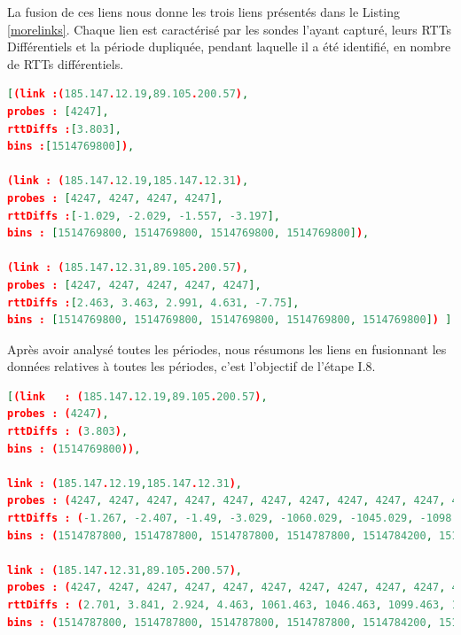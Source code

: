 La fusion de ces liens nous donne les trois liens présentés dans le Listing \ref{morelinks}. Chaque lien est caractérisé par les sondes l'ayant capturé, leurs  RTTs Différentiels et la période dupliquée, pendant laquelle il a été identifié, en nombre de RTTs différentiels. 

\begin{lstlisting}[language=json,firstnumber=1, caption={Caractérisation des liens identifiés lors  de la période 1514769800 avec les traceroutes T1, T2, T3, T4 et T5}, basicstyle = \footnotesize, label =morelinks]
[(link :(185.147.12.19,89.105.200.57),
probes : [4247],
rttDiffs :[3.803],
bins :[1514769800]),

(link : (185.147.12.19,185.147.12.31),
probes : [4247, 4247, 4247, 4247],
rttDiffs :[-1.029, -2.029, -1.557, -3.197],
bins : [1514769800, 1514769800, 1514769800, 1514769800]),

(link : (185.147.12.31,89.105.200.57),
probes : [4247, 4247, 4247, 4247, 4247],
rttDiffs :[2.463, 3.463, 2.991, 4.631, -7.75],
bins : [1514769800, 1514769800, 1514769800, 1514769800, 1514769800]) ]
\end{lstlisting}

Après avoir analysé  toutes les périodes, nous résumons les liens en fusionnant les données relatives à toutes les périodes, c'est l'objectif de l'étape I.8.

\begin{lstlisting}[language=json,firstnumber=1, caption={Illustration de l'ordre des liens}, basicstyle = \footnotesize]
[(link   : (185.147.12.19,89.105.200.57), 
probes : (4247), 
rttDiffs : (3.803), 
bins : (1514769800)),  

link : (185.147.12.19,185.147.12.31), 
probes : (4247, 4247, 4247, 4247, 4247, 4247, 4247, 4247, 4247, 4247, 4247, 4247, 4247, 4247, 4247, 4247, 4247, 4247, 4247, 4247, 4247, 4247, 4247, 4247), 
rttDiffs : (-1.267, -2.407, -1.49, -3.029, -1060.029, -1045.029, -1098.029, -1080.029, -680.029, -845.029, -998.029, -800.029, -1.029, -2.029, -1.557, -3.197, -1.277, -2.017, -1.257, -2.968, -0.96, -1.967, -0.987, -3.201), 
bins : (1514787800, 1514787800, 1514787800, 1514787800, 1514784200, 1514784200, 1514784200, 1514784200, 1514780600, 1514780600, 1514780600, 1514780600, 1514769800, 1514769800, 1514769800, 1514769800, 1514773400, 1514773400, 1514773400, 1514773400, 1514777000, 1514777000, 1514777000, 1514777000)),  

link : (185.147.12.31,89.105.200.57),
probes : (4247, 4247, 4247, 4247, 4247, 4247, 4247, 4247, 4247, 4247, 4247, 4247, 4247, 4247, 4247, 4247, 4247, 4247, 4247, 4247, 4247, 4247, 4247, 4247, 4247),
rttDiffs : (2.701, 3.841, 2.924, 4.463, 1061.463, 1046.463, 1099.463, 1081.463, 681.463, 846.463, 999.463, 801.463, 2.463, 3.463, 2.991, 4.631, -7.75, 2.711, 3.451, 2.691, 4.402, 2.394, 3.401, 2.421, 4.635),
bins : (1514787800, 1514787800, 1514787800, 1514787800, 1514784200, 1514784200, 1514784200, 1514784200, 1514780600, 1514780600, 1514780600, 1514780600, 1514769800, 1514769800, 1514769800, 1514769800, 1514769800, 1514773400, 1514773400, 1514773400, 1514773400, 1514777000, 1514777000, 1514777000, 1514777000))]
\end{lstlisting}


